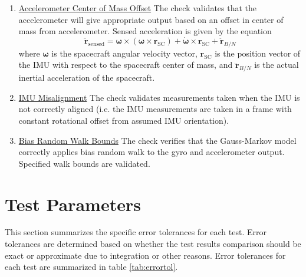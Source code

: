 \begin{enumerate}
	\item \underline{Accelerometer Center of Mass Offset} The check validates that the accelerometer will give appropriate output based on an offset in center of mass from accelerometer. Sensed acceleration is given by the equation
	\begin{equation}
	\ddot{\bm r}_\mathrm{sensed} = \bm\omega \times (\bm\omega \times \bm r_{\mathrm{SC}}) + \dot{\bm\omega} \times \bm r_{\mathrm{SC}} + \ddot{\bm r}_{B/N}
	\end{equation}
	where $\bm\omega$ is the spacecraft angular velocity vector, $\bm r_{\mathrm{SC}}$ is the position vector of the IMU with respect to the spacecraft center of mass, and $ \ddot{\bm r}_{B/N}$ is the actual inertial acceleration of the spacecraft.
	\item \underline{IMU Misalignment} The check validates measurements taken when the IMU is not correctly aligned (i.e. the IMU measurements are taken in a frame with constant rotational offset from assumed IMU orientation).
	\item \underline{Bias Random Walk Bounds} The check verifies that the Gauss-Markov model correctly applies bias random walk to the gyro and accelerometer output. Specified walk bounds are validated.
\end{enumerate} 


\section{Test Parameters}
This section summarizes the specific error tolerances for each test. Error tolerances are determined based on whether the test results comparison should be exact or approximate due to integration or other reasons. Error tolerances for each test are summarized in table \ref{tab:errortol}. 

